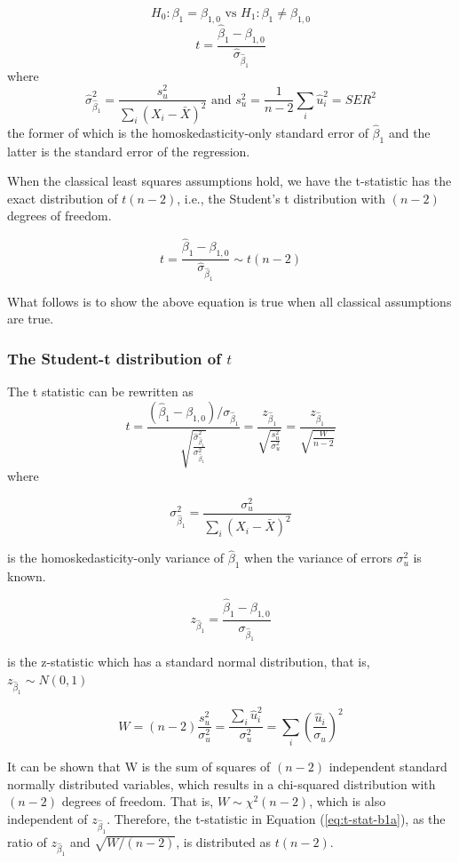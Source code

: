 \documentclass[a4paper,11pt]{article}
\begin{document}
\[H_0: \beta_1 = \beta_{1,0} \text{ vs } H_1: \beta_1 \neq \beta_{1,0}\]
\begin{equation}
t = \frac{\hat{\beta}_1 - \beta_{1,0}}{\hat{\sigma}_{\hat{\beta}_1}}
\end{equation}
where
\begin{equation*}
\hat{\sigma}^2_{\hat{\beta}_1} = \frac{s^2_u}{\sum_i (X_i - \bar{X})^2} \text{ and } s^2_u = \frac{1}{n-2}\sum_i \hat{u}_i^2 = SER^2
\end{equation*}
the former of which is the homoskedasticity-only standard error of
\(\hat{\beta}_1\) and the latter is the standard error of the
regression. 

When the classical least squares assumptions hold, we have the
t-statistic has the exact distribution of \(t(n-2)\), i.e., the
Student's t distribution with \((n-2)\) degrees of freedom. 

\[ t = \frac{\hat{\beta}_1 -
\beta_{1,0}}{\hat{\sigma}_{\hat{\beta}_1}} \sim t(n-2) \]

What follows is to show the above equation is true when all classical
assumptions are true. 

\subsubsection*{The Student-t distribution of \(t\)}
\label{sec:orgd01aeaa}

The t statistic can be rewritten as
\begin{equation}
\label{eq:t-stat-b1a}
t = \frac{(\hat{\beta}_1 - \beta_{1,0})/\sigma_{\hat{\beta}_1}}{\sqrt{\frac{\hat{\sigma}^2_{\hat{\beta}_1}}{\sigma^2_{\hat{\beta}_1}}}} 
= \frac{z_{\hat{\beta}_1}}{\sqrt{\frac{s^2_u}{\sigma^2_u}}} = \frac{z_{\hat{\beta}_1}}{\sqrt{\frac{W}{n-2}}}
\end{equation}
where 

\[\sigma^2_{\hat{\beta}_1} = \frac{\sigma^2_u}{\sum_i (X_i -
\bar{X})^2} \] 

is the homoskedasticity-only variance of
\(\hat{\beta}_1\) when the variance of errors \(\sigma^2_u\) is known.  

\[
z_{\hat{\beta}_1} =\frac{\hat{\beta}_1 -
\beta_{1,0}}{\sigma_{\hat{\beta}_1}} 
\] 

is the z-statistic which has a standard normal distribution, that is,
\(z_{\hat{\beta}_1} \sim N(0, 1)\)

\[ 
W = (n-2)\frac{s^2_u}{\sigma^2_u} =
\frac{\sum_i\hat{u}_i^2}{\sigma^2_u} = \sum_i
\left(\frac{\hat{u}_i}{\sigma_u}\right)^2
 \] 

It can be shown that W is the sum of squares of \((n-2)\) independent
standard normally distributed variables, which results in a
chi-squared distribution with \((n-2)\) degrees of freedom. That is, \(W
\sim \chi^2(n-2)\), which is also independent of
\(z_{\hat{\beta}_1}\). Therefore, the t-statistic in Equation
(\ref{eq:t-stat-b1a}), as the ratio of \(z_{\hat{\beta}_1}\) and
\(\sqrt{W/(n-2)}\), is distributed as \(t(n-2)\).
\end{document}
